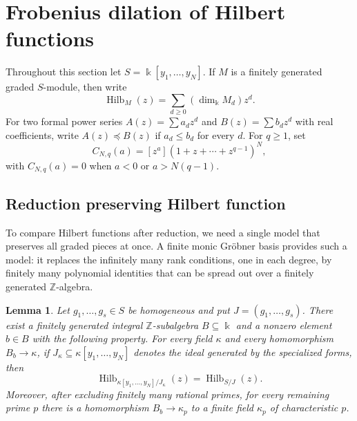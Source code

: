 \documentclass[11pt]{amsart}
\newtheorem{lemma}[theorem]{Lemma}
\theoremstyle{remark}
\newcommand{\kk}{\Bbbk}
\newcommand{\ZZ}{\mathbb Z}
\newcommand{\Hilb}{\operatorname{Hilb}}
\begin{document}
\section{Frobenius dilation of Hilbert functions}\label{sec:frobenius}

Throughout this section let $S=\kk[y_1,\ldots,y_N]$. If $M$ is a finitely generated graded $S$-module, then write
$$
\Hilb_M(z)=\sum_{d\ge0}(\dim_{\kk}M_d)z^d.
$$
For two formal power series $A(z)=\sum a_dz^d$ and $B(z)=\sum b_dz^d$ with real coefficients, write $A(z)\preceq B(z)$ if $a_d\le b_d$ for every $d$. For $q\ge1$, set
$$
C_{N,q}(a)=[z^a](1+z+\cdots+z^{q-1})^N,
$$
with $C_{N,q}(a)=0$ when $a<0$ or $a>N(q-1)$.

\subsection{Reduction preserving Hilbert function}

To compare Hilbert functions after reduction, we need a single model that preserves all graded pieces at once. A finite monic Gr\"obner basis provides such a model: it replaces the infinitely many rank conditions, one in each degree, by finitely many polynomial identities that can be spread out over a finitely generated $\ZZ$-algebra.

\begin{lemma}\label{lem:HF-good-reduction}
Let $g_1,\ldots,g_s\in S$ be homogeneous and put $J=(g_1,\ldots,g_s)$. There exist a finitely generated integral $\ZZ$-subalgebra $B\subseteq\kk$ and a nonzero element $b\in B$ with the following property. For every field $\kappa$ and every homomorphism $B_b\to\kappa$, if $J_\kappa\subseteq\kappa[y_1,\ldots,y_N]$ denotes the ideal generated by the specialized forms, then
$$
\Hilb_{\kappa[y_1,\ldots,y_N]/J_\kappa}(z)=\Hilb_{S/J}(z).
$$
Moreover, after excluding finitely many rational primes, for every remaining prime $p$ there is a homomorphism $B_b\to\kappa_p$ to a finite field $\kappa_p$ of characteristic $p$.
\end{lemma}
\end{document}
